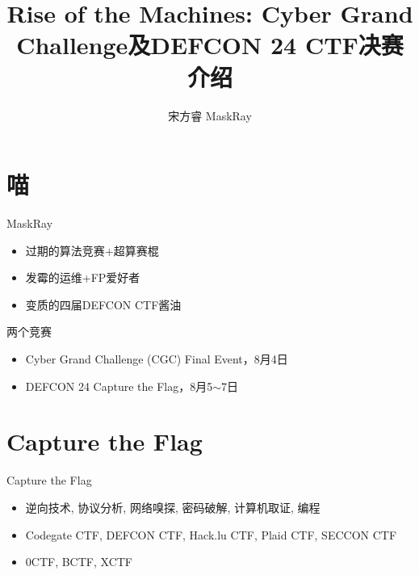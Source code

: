 \documentclass{beamer}
\title{Rise of the Machines: Cyber Grand Challenge及DEFCON 24 CTF决赛介绍}
\author{宋方睿 MaskRay}
\institute{https://maskray.me}
\date{}
\begin{document}
\begin{frame}
  \titlepage
\end{frame}

\begin{frame}
  \tableofcontents
\end{frame}

\section{喵}

{

  \begin{frame}
    \begin{block}{MaskRay}
      \begin{itemize}[<+-|alert@+>]
        \item 过期的算法竞赛+超算赛棍
        \item 发霉的运维+FP爱好者
        \item 变质的四届DEFCON CTF酱油
      \end{itemize}
    \end{block}
  \end{frame}
}

\begin{frame}
  \begin{block}{两个竞赛}
    \begin{itemize}
      \item Cyber Grand Challenge (CGC) Final Event，8月4日
      \item DEFCON 24 Capture the Flag，8月5$\sim$7日
    \end{itemize}
  \end{block}
\end{frame}

\section{Capture the Flag}

\begin{frame}
  \begin{block}{Capture the Flag}
    \begin{itemize}
      \item 逆向技术, 协议分析, 网络嗅探, 密码破解, 计算机取证, 编程
      \item Codegate CTF, DEFCON CTF, Hack.lu CTF, Plaid CTF, SECCON CTF
      \item 0CTF, BCTF, XCTF
    \end{itemize}
  \end{block}
\end{frame}
\end{document}
